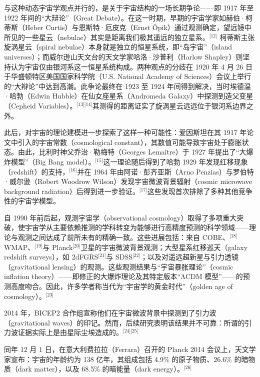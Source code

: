 与这种动态宇宙学观点并行的，是关于宇宙结构的一场长期争论——即 1917 年至 1922 年间的“大辩论”（Great Debate）。在这一时期，早期的宇宙学家如赫伯·柯蒂斯（Heber Curtis）与恩斯特·厄皮克（Ernst Öpik）通过观测确定，望远镜中所见的一些星云（nebulae）其实是距离我们极其遥远的独立星系。\(^\text{[12]}\) 柯蒂斯主张旋涡星云（spiral nebulae）本身就是独立的恒星系统，即“岛宇宙”（island universes）；而威尔逊山天文台的天文学家哈洛·沙普利（Harlow Shapley）则坚持认为宇宙仅由银河系这一恒星系统构成。两种观点的分歧在 1920 年 4 月 26 日于华盛顿特区美国国家科学院（U.S. National Academy of Sciences）会议上举行的“大辩论”中达到高潮。此争论最终在 1923 至 1924 年间得到解决，当时埃德温·哈勃（Edwin Hubble）在仙女座星系（Andromeda Galaxy）中探测到造父变星（Cepheid Variables）。\(^\text{[13][14]}\)其测得的距离证实了旋涡星云远远位于银河系边界之外。

此后，对宇宙的理论建模进一步探索了这样一种可能性：爱因斯坦在其 1917 年论文中引入的宇宙常数（cosmological constant），其数值可能导致宇宙处于膨胀状态。由此，比利时神父乔治·勒梅特（Georges Lemaître）于 1927 年提出了“大爆炸模型”（Big Bang model）。\(^\text{[15]}\)这一理论随后得到了哈勃 1929 年发现红移现象（redshift）的支持，\(^\text{[16]}\)并在 1964 年由阿诺·彭齐亚斯（Arno Penzias）与罗伯特·威尔逊（Robert Woodrow Wilson）发现宇宙微波背景辐射（cosmic microwave background radiation）后得到进一步验证。\(^\text{[17]}\)这些发现首次排除了多种其他竞争性的宇宙学模型。

自 1990 年前后起，观测宇宙学（observational cosmology）取得了多项重大突破，使宇宙学从主要依赖推测的学科转变为能够进行高精度预测的科学领域——理论与观测之间达成了前所未有的精确一致。这些进展包括：来自 COBE、\(^\text{[18]}\)WMAP、\(^\text{[19]}\)与 Planck\(^\text{[20]}\)卫星的宇宙微波背景观测；大型星系红移巡天（galaxy redshift surveys），如 2dFGRS\(^\text{[21]}\)与 SDSS\(^\text{[22]}\)；以及对遥远超新星与引力透镜（gravitational lensing）的观测。这些观测结果与“宇宙暴胀理论”（cosmic inflation theory）——即修正的大爆炸理论及其特定版本“ΛCDM 模型”——的预测高度吻合。因此，许多学者称当代为“宇宙学的黄金时代”（golden age of cosmology）。\(^\text{[23]}\)

2014 年，BICEP2 合作组宣称他们在宇宙微波背景中探测到了引力波（gravitational waves）的印记。然而，后续研究表明该结果并不可靠：所谓的引力波证据实际上是由星际尘埃造成的。\(^\text{[24][25]}\)

同年 12 月 1 日，在意大利费拉拉（Ferrara）召开的 Planck 2014 会议上，天文学家宣布：宇宙的年龄约为 138 亿年，其组成包括 4.9\% 的原子物质、26.6\% 的暗物质（dark matter），以及 68.5\% 的暗能量（dark energy）。\(^\text{[26]}\)
